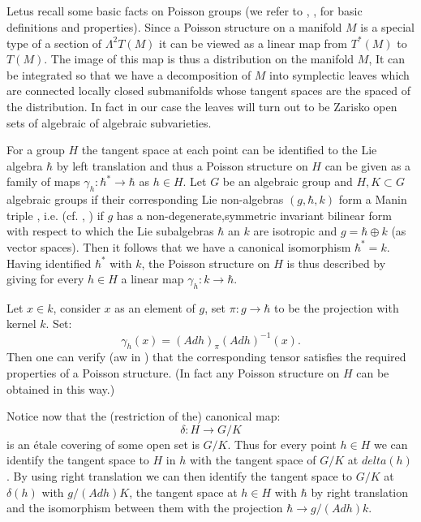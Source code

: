 \subsection{}\label{chap4-subsec-4.2}
Let\pageoriginale us recall some basic facts on Poisson groups (we refer to \cite{chap4-keyD}, \cite{chap4-keySTS}, \cite{chap4-keyLW} for basic definitions and properties). Since a Poisson structure on a manifold $M$  is a special type of a section of
$\Lambda^{2}T(M)$ it can be viewed as a linear map from $T^{*}(M)$ to $T(M)$. The image of this map is thus a distribution on the manifold $M$, It can be integrated so that we have a decomposition of $M$ into symplectic leaves which are connected locally closed submanifolds whose tangent spaces are the spaced of the distribution. In fact in our case the leaves will turn out to be Zarisko open sets of algebraic of algebraic subvarieties.

For a group $H$ the tangent space at each point can be identified to the Lie algebra $\hbar$ by left translation and thus a Poisson structure on $H$ can be given as a family of maps $\gamma_{h} : \hbar^{*} \rightarrow \hbar$ as $h \in H$. Let $G$ be an algebraic group and $H, K \subset G$ algebraic groups if their corresponding Lie non-algebras $(g, \hbar, k)$
form a Manin triple , i.e. (cf. \cite{chap4-keyD}, \cite{chap4-keyLW}) if $g$ has a non-degenerate,symmetric invariant bilinear form with respect to which the Lie subalgebras $\hbar$ an $k$ are isotropic and $g=\hbar \oplus k$ (as vector spaces). Then it follows that we have a canonical isomorphism $\hbar^{*} =k$. Having identified $\hbar^{*}$ with $k$, the Poisson structure on $H$ is thus described by giving for every $h\in H $ a linear map $\gamma_{h} : k \rightarrow \hbar$.  

Let $x\in k$, consider $x$ as an element of $g$, set $\pi : g \rightarrow \hbar$ to be the projection with kernel $k$. Set:
$$
\gamma_{h}(x) = (Adh)_{\pi}(Adh)^{-1}(x).
$$
Then one can verify (aw in \cite{chap4-keyLW}) that the corresponding tensor satisfies the required properties of a Poisson structure. (In fact any Poisson structure on $H$ can be obtained in this way.)

Notice now that the (restriction of the) canonical map:
$$
\delta: H\rightarrow G/K
$$
is an \'etale covering of some open set is $G/K$. Thus for every point $h\in H$ we can identify the tangent space to $H$ in $h$ with the tangent space of $G/K$ at $delta(h)$. By using right translation we can then identify the tangent space to $G/K$ at $\delta(h)$ with $g/(Adh)K$, the tangent space at $h\in H$ with $\hbar$ by right translation and the isomorphism between them with the projection $\hbar \rightarrow g/(Adh)k$. 

